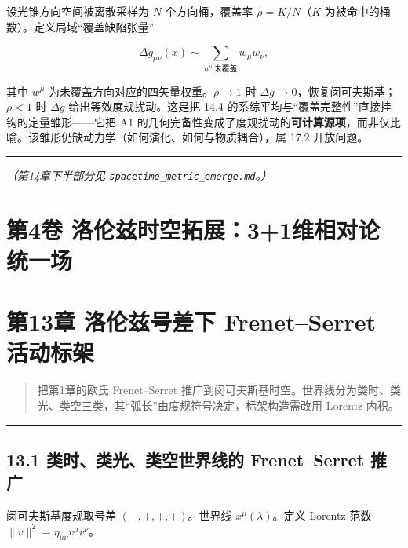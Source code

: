 设光锥方向空间被离散采样为 \(N\) 个方向桶，覆盖率 \(\rho=K/N\)（\(K\)
为被命中的桶数）。定义局域``覆盖缺陷张量''

\[
\Delta g_{\mu\nu}(x)\sim \sum_{n^\mu\ \text{未覆盖}} w_\mu w_\nu,
\]

其中 \(w^\mu\) 为未覆盖方向对应的四矢量权重。\(\rho\to1\) 时
\(\Delta g\to0\)，恢复闵可夫斯基；\(\rho<1\) 时 \(\Delta g\)
给出等效度规扰动。这是把 14.4
的系综平均与``覆盖完整性''直接挂钩的定量雏形------它把 A1
的几何完备性变成了度规扰动的\textbf{可计算源项}，而非仅比喻。该雏形仍缺动力学（如何演化、如何与物质耦合），属
17.2 开放问题。

\begin{center}\rule{0.5\linewidth}{0.5pt}\end{center}

\emph{（第14章下半部分见 \texttt{spacetime\_metric\_emerge.md}。）}

\section{第4卷
洛伦兹时空拓展：3+1维相对论统一场}\label{ux7b2c4ux5377-ux6d1bux4f26ux5179ux65f6ux7a7aux62d3ux5c5531ux7ef4ux76f8ux5bf9ux8bbaux7edfux4e00ux573a}

\section{第13章 洛伦兹号差下 Frenet--Serret
活动标架}\label{ux7b2c13ux7ae0-ux6d1bux4f26ux5179ux53f7ux5deeux4e0b-frenetserret-ux6d3bux52a8ux6807ux67b6-1}

\begin{quote}
把第1章的欧氏 Frenet--Serret
推广到闵可夫斯基时空。世界线分为类时、类光、类空三类，其``弧长''由度规符号决定，标架构造需改用
Lorentz 内积。
\end{quote}

\begin{center}\rule{0.5\linewidth}{0.5pt}\end{center}

\subsection{13.1 类时、类光、类空世界线的 Frenet--Serret
推广}\label{ux7c7bux65f6ux7c7bux5149ux7c7bux7a7aux4e16ux754cux7ebfux7684-frenetserret-ux63a8ux5e7f}

闵可夫斯基度规取号差 \((-,+,+,+)\)。世界线 \(x^\mu(\lambda)\)。定义
Lorentz 范数 \(\|v\|^2=\eta_{\mu\nu}v^\mu v^\nu\)。

